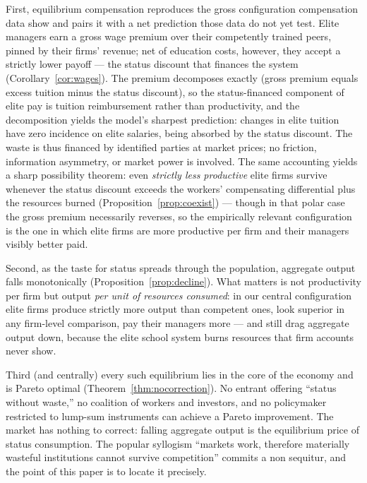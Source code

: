 \documentclass[12pt,letterpaper]{article}
\theoremstyle{definition}
\begin{document}
First, equilibrium compensation reproduces the gross configuration compensation data show and pairs it with a net prediction those data do not yet test.
Elite managers earn a gross wage premium over their competently trained peers, pinned by their firms' revenue; net of education costs, however, they accept a strictly lower payoff --- the status discount that finances the system (Corollary~\ref{cor:wages}).
The premium decomposes exactly (gross premium equals excess tuition minus the status discount), so the status-financed component of elite pay is tuition reimbursement rather than productivity, and the decomposition yields the model's sharpest prediction: changes in elite tuition have zero incidence on elite salaries, being absorbed by the status discount.
The waste is thus financed by identified parties at market prices; no friction, information asymmetry, or market power is involved.
The same accounting yields a sharp possibility theorem: even \emph{strictly less productive} elite firms survive whenever the status discount exceeds the workers' compensating differential plus the resources burned (Proposition~\ref{prop:coexist}) --- though in that polar case the gross premium necessarily reverses, so the empirically relevant configuration is the one in which elite firms are more productive per firm and their managers visibly better paid.

Second, as the taste for status spreads through the population, aggregate output falls monotonically (Proposition~\ref{prop:decline}).
What matters is not productivity per firm but output \emph{per unit of resources consumed}: in our central configuration elite firms produce strictly more output than competent ones, look superior in any firm-level comparison, pay their managers more --- and still drag aggregate output down, because the elite school system burns resources that firm accounts never show.

Third (and centrally) every such equilibrium lies in the core of the economy and is Pareto optimal (Theorem~\ref{thm:nocorrection}).
No entrant offering ``status without waste,'' no coalition of workers and investors, and no policymaker restricted to lump-sum instruments can achieve a Pareto improvement.
The market has nothing to correct: falling aggregate output is the equilibrium price of status consumption.
The popular syllogism ``markets work, therefore materially wasteful institutions cannot survive competition'' commits a non sequitur, and the point of this paper is to locate it precisely.
\end{document}
